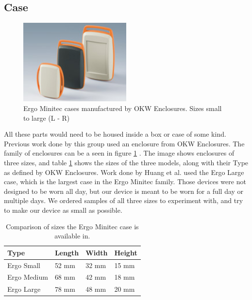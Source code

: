 \subsection{Case}
\label{Sec:Case}
\begin{figure}
\begin{center}
\includegraphics[width=0.5\textwidth]{images/OKWEN.jpg}
\caption{Ergo Minitec cases manufactured by OKW Enclosures. Sizes small to large (L - R)}
\label{Fig:OKWFam}
\end{center}
\end{figure}
All these parts would need to be housed inside a box or case of some kind.
Previous work done by this group used an enclosure from OKW Enclosures.
The family of enclosures can be a seen in figure \ref{Fig:OKWFam} \cite{Web:OKWPics}.
The image shows enclosures of three sizes,
and table \ref{Tab:OKWSize} shows the sizes of the three models,
along with their Type as defined by OKW Enclosures.
Work done by Huang et al. \cite{huang2013assessment} used the Ergo Large case,
which is the largest case in the Ergo Minitec family.
Those devices were not designed to be worn all day,
but our device is meant to be worn for a full day or multiple days.
We ordered samples of all three sizes to experiment with,
and try to make our device as small as possible.
\begin{table}[h]
\centering
\begin{tabular}{@{}llll@{}}
\toprule
Type & Length & Width & Height \\ \midrule
Ergo Small   & 52 mm  & 32 mm & 15 mm  \\
Ergo Medium   & 68 mm  & 42 mm & 18 mm  \\
Ergo Large   & 78 mm  & 48 mm & 20 mm  \\ \bottomrule
\end{tabular}
\caption{Comparison of sizes the Ergo Minitec case is available in.}
\label{Tab:OKWSize}
\end{table}

